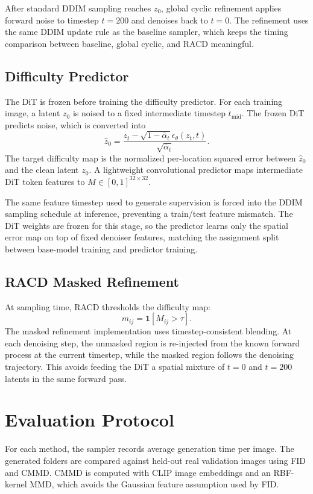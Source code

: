 \documentclass{article}
\begin{document}
After standard DDIM sampling reaches $z_0$, global cyclic refinement applies
forward noise to timestep $t=200$ and denoises back to $t=0$. The refinement
uses the same DDIM update rule as the baseline sampler, which keeps the timing
comparison between baseline, global cyclic, and RACD meaningful.

\subsection{Difficulty Predictor}

The DiT is frozen before training the difficulty predictor. For each training
image, a latent $z_0$ is noised to a fixed intermediate timestep $t_{\mathrm{mid}}$.
The frozen DiT predicts noise, which is converted into
\[
  \hat{z}_0 =
  \frac{z_t - \sqrt{1-\bar{\alpha}_t}\epsilon_\theta(z_t,t)}
       {\sqrt{\bar{\alpha}_t}}.
\]
The target difficulty map is the normalized per-location squared error between
$\hat{z}_0$ and the clean latent $z_0$. A lightweight convolutional predictor
maps intermediate DiT token features to $M \in [0,1]^{32 \times 32}$.

The same feature timestep used to generate supervision is forced into the DDIM
sampling schedule at inference, preventing a train/test feature mismatch.
The DiT weights are frozen for this stage, so the predictor learns only the
spatial error map on top of fixed denoiser features, matching the assignment
split between base-model training and predictor training.

\subsection{RACD Masked Refinement}

At sampling time, RACD thresholds the difficulty map:
\[
  m_{ij} = \mathbf{1}[M_{ij} > \tau].
\]
The masked refinement implementation uses timestep-consistent blending. At
each denoising step, the unmasked region is re-injected from the known forward
process at the current timestep, while the masked region follows the denoising
trajectory. This avoids feeding the DiT a spatial mixture of $t=0$ and
$t=200$ latents in the same forward pass.

\section{Evaluation Protocol}

For each method, the sampler records average generation time per image. The
generated folders are compared against held-out real validation images using
FID and CMMD. CMMD is computed with CLIP image embeddings and an RBF-kernel MMD,
which avoids the Gaussian feature assumption used by FID.
\end{document}
